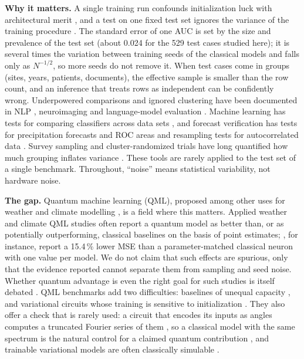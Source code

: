 \documentclass[11pt,a4paper]{article}
\begin{document}
\textbf{Why it matters.} A single training run confounds initialization luck with architectural merit \citep{henderson2018,bouthillier2021}, and a test on one fixed test set ignores the variance of the training procedure \citep{dietterich1998,nadeau2003}. The standard error of one AUC is set by the size and prevalence of the test set (about 0.024 for the 529 test cases studied here); it is several times the variation between training seeds of the classical models and falls only as $N^{-1/2}$, so more seeds do not remove it. When test cases come in groups (sites, years, patients, documents), the effective sample is smaller than the row count, and an inference that treats rows as independent can be confidently wrong. Underpowered comparisons and ignored clustering have been documented in NLP \citep{card2020,dror2018}, neuroimaging \citep{varoquaux2018} and language-model evaluation \citep{miller2024}. Machine learning has tests for comparing classifiers across data sets \citep{demsar2006,benavoli2017}, and forecast verification has tests for precipitation forecasts and ROC areas \citep{hamill1999,mason2002} and resampling tests for autocorrelated data \citep{wilks1997}. Survey sampling and cluster-randomized trials have long quantified how much grouping inflates variance \citep{kish1965,donner2000}. These tools are rarely applied to the test set of a single benchmark. Throughout, ``noise'' means statistical variability, not hardware noise.

\textbf{The gap.} Quantum machine learning (QML), proposed among other uses for weather and climate modelling \citep{schwabe2025op}, is a field where this matters. Applied weather and climate QML studies \citep{pastori2026,dasilva2026,fellner2026} often report a quantum model as better than, or as potentially outperforming, classical baselines on the basis of point estimates; \citet{marchisio2026}, for instance, report a 15.4\,\% lower MSE than a parameter-matched classical neuron with one value per model. We do not claim that such effects are spurious, only that the evidence reported cannot separate them from sampling and seed noise. Whether quantum advantage is even the right goal for such studies is itself debated \citep{schuld2022}. QML benchmarks add two difficulties: baselines of unequal capacity \citep{bowles2024}, and variational circuits whose training is sensitive to initialization \citep{mcclean2018}. They also offer a check that is rarely used: a circuit that encodes its inputs as angles computes a truncated Fourier series of them \citep{schuld2021fourier}, so a classical model with the same spectrum is the natural control for a claimed quantum contribution \citep{schreiber2023,landman2023}, and trainable variational models are often classically simulable \citep{cerezo2025,gilfuster2025}.
\end{document}
